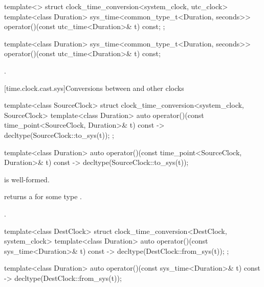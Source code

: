 \begin{codeblock}
template<>
struct clock_time_conversion<system_clock, utc_clock> {
  template<class Duration>
    sys_time<common_type_t<Duration, seconds>>
      operator()(const utc_time<Duration>& t) const;
};
\end{codeblock}

%
\begin{itemdecl}
template<class Duration>
  sys_time<common_type_t<Duration, seconds>>
    operator()(const utc_time<Duration>& t) const;
\end{itemdecl}

\begin{itemdescr}
\pnum
\returns
{}.
\end{itemdescr}

[time.clock.cast.sys]{Conversions between  and other clocks}

\begin{codeblock}
template<class SourceClock>
struct clock_time_conversion<system_clock, SourceClock> {
  template<class Duration>
    auto operator()(const time_point<SourceClock, Duration>& t) const
      -> decltype(SourceClock::to_sys(t));
};
\end{codeblock}

%
\begin{itemdecl}
template<class Duration>
  auto operator()(const time_point<SourceClock, Duration>& t) const
    -> decltype(SourceClock::to_sys(t));
\end{itemdecl}

\begin{itemdescr}
\pnum
\constraints
{} is well-formed.

\pnum
\mandates
{} returns a 
for some type .

\pnum
\returns
{}.
\end{itemdescr}

\begin{codeblock}
template<class DestClock>
struct clock_time_conversion<DestClock, system_clock> {
  template<class Duration>
    auto operator()(const sys_time<Duration>& t) const
      -> decltype(DestClock::from_sys(t));
};
\end{codeblock}

%
\begin{itemdecl}
template<class Duration>
  auto operator()(const sys_time<Duration>& t) const
    -> decltype(DestClock::from_sys(t));
\end{itemdecl}

